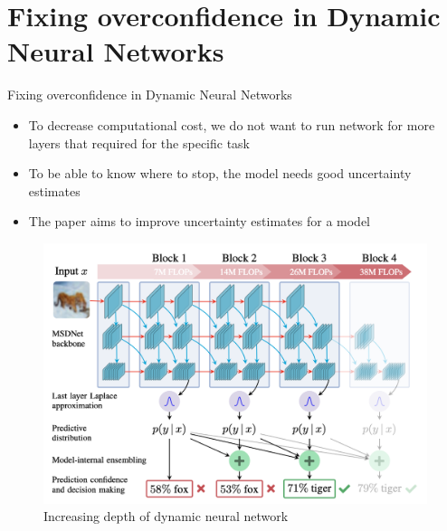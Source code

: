 \documentclass[aspectratio=169,xcolor=dvipsnames]{beamer}
\begin{document}
\section{Fixing overconfidence in Dynamic Neural Networks}
\begin{frame}{Fixing overconfidence in Dynamic Neural Networks}
\cite{meronen_fixing_2023}
    \begin{itemize}
        \item To decrease computational cost, we do not want to run network for more layers that required for the specific task
        \item To be able to know where to stop, the model needs good uncertainty estimates
        \item The paper aims to improve uncertainty estimates for a model
    \end{itemize}
    \begin{figure}
        \centering
        \includegraphics[width=0.4\linewidth]{figs/Screenshot 2025-04-08 at 15.02.28.png}
        \caption{Increasing depth of dynamic neural network}
        \label{fig:enter-label}
    \end{figure}
\end{frame}
\end{document}
